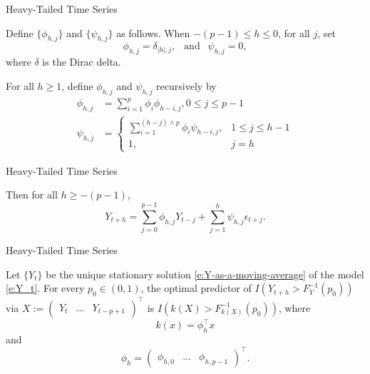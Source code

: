 \documentclass{beamer}
\begin{document}
\begin{frame}{Heavy-Tailed Time Series}
    \begin{lemma}\label{lem:recursion}
        Define $\{\phi_{h, j}\}$ and $\{\psi_{h, j}\}$ as follows. When $-(p - 1) \le h \le 0$, for all $j$, set
        \[
        \phi_{h, j} = \delta_{|h|, j},\ \ \mbox{ and } \ \  \psi_{h, j} = 0,
        \]
        where $\delta$ is the Dirac delta.
    
        For all $h \ge 1$, define $\phi_{h, j}$ and $\psi_{h, j}$ recursively by
        \begin{align*}
            \phi_{h, j} &= \sum_{i = 1}^p \phi_i\phi_{h - i, j}, 0 \le j \le p - 1 \\
            \psi_{h, j} &=
            \begin{cases}
                \sum_{i = 1}^{(h - j) \wedge p} \phi_i\psi_{h - i, j}, & 1 \le j \le h - 1 \\
                1, & j = h
            \end{cases}
        \end{align*}
    \end{lemma}
\end{frame}

\begin{frame}{Heavy-Tailed Time Series}
    \begin{lemma}
        Then for all $h \ge -(p - 1)$,
        \begin{equation}\label{eq:y_t_plus_h_expr}
        Y_{t + h} = \sum_{j = 0}^{p - 1} \phi_{h, j}Y_{t - j} + \sum_{j = 1}^h \psi_{h, j}\epsilon_{t + j}. 
        \end{equation}
    \end{lemma}
\end{frame}

\begin{frame}{Heavy-Tailed Time Series}
    \begin{theorem}\label{thm:AR(p)-optimal-predictors}
    Let $\{Y_t\}$ be the unique stationary solution \eqref{e:Y-as-a-moving-average} of the model \eqref{e:Y_t}. For every $p_0 \in (0,1)$, the optimal predictor of $I(Y_{t+h}> F_Y^{-1}(p_0))$
    via $X:=(\begin{matrix}Y_t & \ldots & Y_{t - p + 1}\end{matrix})^{\top}$ is $I(k(X) > F_{k(X)}^{-1}(p_0))$, where 
    \[
    k(x) = \phi_h^{\top}x
    \]
    and
    \[
    \phi_h = (\begin{matrix}\phi_{h, 0} & \ldots & \phi_{h, p - 1}\end{matrix})^{\top}.
    \]
    \end{theorem}
\end{frame}
\end{document}

